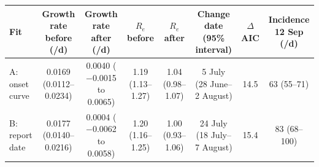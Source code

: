 \begin{tabular}{@{}lccccccc@{}}
\toprule
Fit & Growth rate before (/d) & Growth rate after (/d) & $R_e$ before & $R_e$ after & Change date (95\% interval) & $\Delta$AIC & Incidence 12 Sep (/d) \\
\midrule
A: onset curve & 0.0169 (0.0112--0.0234) & 0.0040 ($-$0.0015 to 0.0065) & 1.19 (1.13--1.27) & 1.04 (0.98--1.07) & 5 July (28 June--2 August) & 14.5 & 63 (55--71) \\
B: report date & 0.0177 (0.0140--0.0216) & 0.0004 ($-$0.0062 to 0.0058) & 1.20 (1.16--1.25) & 1.00 (0.93--1.06) & 24 July (18 July--7 August) & 15.4 & 83 (68--100) \\
\bottomrule
\end{tabular}
